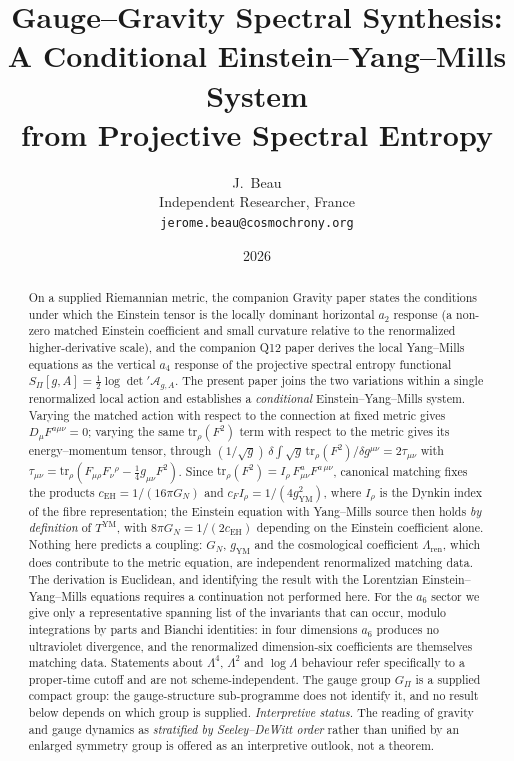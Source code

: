 \documentclass[12pt,a4paper]{article}
\title{Gauge--Gravity Spectral Synthesis:\\
A Conditional Einstein--Yang--Mills System\\
from Projective Spectral Entropy}
\author{J.\ Beau\\
\small Independent Researcher, France\\
\small \texttt{jerome.beau@cosmochrony.org}}
\date{2026}
\theoremstyle{remark}
\begin{document}
  \maketitle

  \begin{abstract}
    On a supplied Riemannian metric, the companion Gravity paper states the conditions under which the Einstein
    tensor is the locally dominant horizontal $a_2$ response (a non-zero matched Einstein coefficient and small curvature
    relative to the renormalized higher-derivative scale), and the companion Q12 paper derives the local
    Yang--Mills equations as the vertical $a_4$ response
    of the projective spectral entropy functional
    $S_\Pi[g,A] = \tfrac{1}{2}\log\det' \mathcal{A}_{g,A}$.
    The present paper joins the two variations within a single renormalized local action and
    establishes a \emph{conditional} Einstein--Yang--Mills system.
    Varying the matched action with respect to the connection at fixed metric gives
    $D_\mu F^{a\mu\nu} = 0$; varying the same $\mathrm{tr}_\rho(F^2)$ term with respect to the
    metric gives its energy--momentum tensor, through
    $(1/\sqrt{g})\,\delta\!\int\!\sqrt{g}\,\mathrm{tr}_\rho(F^2)/\delta g^{\mu\nu}
     = 2\tau_{\mu\nu}$ with
    $\tau_{\mu\nu} = \mathrm{tr}_\rho(F_{\mu\rho}F_\nu{}^\rho - \tfrac14 g_{\mu\nu}F^2)$.
    Since $\mathrm{tr}_\rho(F^2) = I_\rho\,F^a_{\mu\nu}F^{a\,\mu\nu}$, canonical matching fixes
    the products $c_{\mathrm{EH}} = 1/(16\pi G_N)$ and
    $c_F I_\rho = 1/(4g_{\mathrm{YM}}^2)$, where $I_\rho$ is the Dynkin index of the fibre
    representation; the Einstein equation with Yang--Mills source then holds \emph{by definition}
    of $T^{\mathrm{YM}}$, with $8\pi G_N = 1/(2c_{\mathrm{EH}})$ depending on the Einstein
    coefficient alone.
    Nothing here predicts a coupling: $G_N$, $g_{\mathrm{YM}}$ and the cosmological coefficient
    $\Lambda_{\mathrm{ren}}$, which does contribute to the metric equation, are independent
    renormalized matching data.
    The derivation is Euclidean, and identifying the result with the Lorentzian
    Einstein--Yang--Mills equations requires a continuation not performed here.
    For the $a_6$ sector we give only a representative spanning list of the invariants that can
    occur, modulo integrations by parts and Bianchi identities: in four dimensions $a_6$ produces
    no ultraviolet divergence, and the renormalized dimension-six coefficients are themselves
    matching data.
    Statements about $\Lambda^4$, $\Lambda^2$ and $\log\Lambda$ behaviour refer specifically to a
    proper-time cutoff and are not scheme-independent.
    The gauge group $G_\Pi$ is a supplied compact group: the gauge-structure sub-programme does
    not identify it, and no result below depends on which group is supplied.
    \emph{Interpretive status.} The reading of gravity and gauge dynamics as \emph{stratified by
    Seeley--DeWitt order} rather than unified by an enlarged symmetry group is offered as an
    interpretive outlook, not a theorem.
  \end{abstract}
\end{document}
